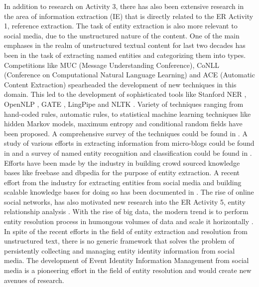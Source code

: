 In addition to research on Activity 3, there has also been extensive research in the area of information extraction (IE) that is directly related to the ER Activity 1, reference extraction. The task of entity extraction is also more relevant to social media, due to the unstructured nature of the content. One of the main emphases in the realm of unstructured textual content for last two decades has been in the task of extracting named entities and categorizing them into types. Competitions like MUC (Message Understanding Conference), CoNLL (Conference on Computational Natural Language Learning) and ACE (Automatic Content Extraction) spearheaded the development of new techniques in this domain. This led to the development of sophisticated tools like Stanford NER \cite{finkel2007named}, OpenNLP \cite{baldridge2005opennlp}, GATE \cite{cunningham2002gate}, LingPipe \cite{baldwin2003lingpipe} and NLTK \cite{bird2006nltk}. Variety of techniques ranging from hand-coded rules, automatic rules, to statistical machine learning techniques like hidden Markov models, maximum entropy and conditional random fields have been proposed. A comprehensive survey of the techniques could be found in \cite{piskorski2013information,sarawagi2008information}. A study of various efforts in extracting information from micro-blogs could be found in \cite{hua2012information} and a survey of named entity recognition and classification could be found in \cite{nadeau2007survey}. Efforts have been made by the industry in building crowd sourced knowledge bases like freebase \cite{bollacker2008freebase} and dbpedia \cite{auer2007dbpedia} for the purpose of entity extraction. A recent effort from the industry for extracting entities from social media and building scalable knowledge bases for doing so has been documented in \cite{deshpande2013building,gattani2013entity}. The rise of online social networks, has also motivated new research into the ER Activity 5, entity relationship analysis \cite{bilgic2006d}. With the rise of big data, the modern trend is to perform entity resolution process in humongous volumes of data and scale it horizontally \cite{kolb2012dedoop,talburt2015entity}. In spite of the recent efforts in the field of entity extraction and resolution from unstructured text, there is no generic framework that solves the problem of persistently collecting and managing entity identity information from social media. The development of Event Identity Information Management from social media is a pioneering effort in the field of entity resolution and would create new avenues of research.

